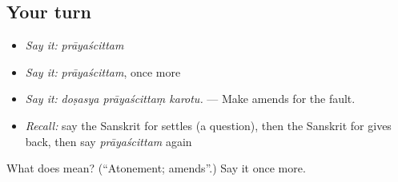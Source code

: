 \subsection*{Your turn}
\begin{itemize}
\raggedright
  \item \emph{Say it:} \emph{prāyaścittam}
  \item \emph{Say it:} \emph{prāyaścittam}, once more
  \item \emph{Say it:} \emph{doṣasya prāyaścittaṃ karotu.} — Make amends for the fault.
  \item \emph{Recall:} say the Sanskrit for settles (a question), then the Sanskrit for gives back, then say \emph{prāyaścittam} again
\end{itemize}

\begin{tcolorbox}[breakable,colback=teal!4,colframe=teal!35!black,title={Before you move on}]
What does  mean? (\textquotedblleft{}Atonement; amends\textquotedblright{}.) Say it once more.
\end{tcolorbox}
